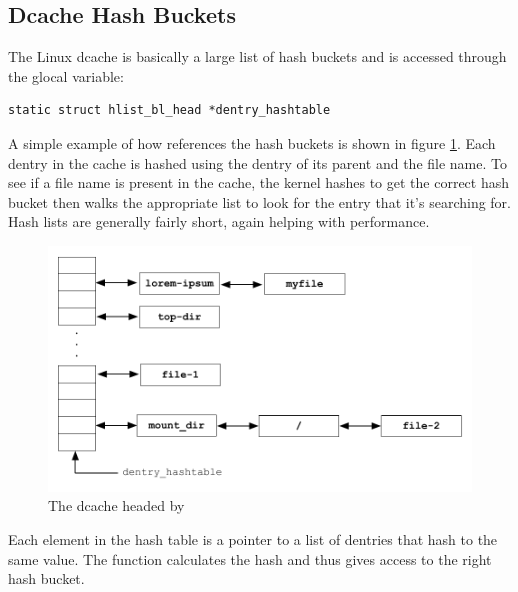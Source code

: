 
\subsection{Dcache Hash Buckets}

The Linux dcache is basically a large list of hash buckets and is accessed through the glocal  variable:

\begin{lstlisting}
static struct hlist_bl_head *dentry_hashtable
\end{lstlisting}

\noindent
A simple example of how  references the hash buckets is shown in figure \ref{fig:kernel-dentry-hashtable}. Each dentry in the cache is hashed using the dentry of its parent and the file name. To see if a file name is present in the cache, the kernel hashes to get the correct hash bucket then walks the appropriate list to look for the entry that it's searching for. Hash lists are generally fairly short, again helping with performance.


\begin{figure}[h]
	\includegraphics[scale=0.6]{figures/kernel-dentry_hashtable.pdf}
	\centering
	\caption{The dcache headed by }
	\label{fig:kernel-dentry-hashtable}
\end{figure}

Each element in the hash table is a pointer to a list of dentries that hash to the same value. The function  calculates the hash and thus gives access to the right hash bucket.

